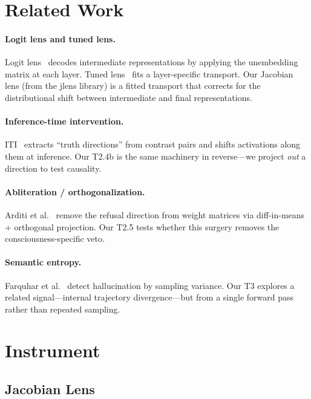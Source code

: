 \documentclass[11pt,a4paper]{article}
\begin{document}
\section{Related Work}

\paragraph{Logit lens and tuned lens.} Logit lens~\cite{nostalgebraist2020} decodes intermediate representations by applying the unembedding matrix at each layer. Tuned lens~\cite{belrose2023tuned} fits a layer-specific transport. Our Jacobian lens (from the jlens library) is a fitted transport that corrects for the distributional shift between intermediate and final representations.

\paragraph{Inference-time intervention.} ITI~\cite{li2024inference} extracts ``truth directions'' from contrast pairs and shifts activations along them at inference. Our T2.4b is the same machinery in reverse---we project \emph{out} a direction to test causality.

\paragraph{Abliteration / orthogonalization.} Arditi et al.~\cite{arditi2024refusal} remove the refusal direction from weight matrices via diff-in-means + orthogonal projection. Our T2.5 tests whether this surgery removes the consciousness-specific veto.

\paragraph{Semantic entropy.} Farquhar et al.~\cite{farquhar2024semantic} detect hallucination by sampling variance. Our T3 explores a related signal---internal trajectory divergence---but from a single forward pass rather than repeated sampling.

\section{Instrument}

\subsection{Jacobian Lens}
\end{document}

